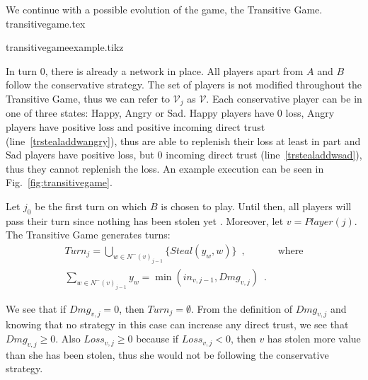   We continue with a possible evolution of the game, the Transitive Game.
  {transitivegame.tex}

  {transitivegameexample.tikz}

  \noindent In turn 0, there is already a network in place. All players apart from $A$ and $B$ follow the conservative
  strategy. The set of players is not modified throughout the Transitive Game, thus we can refer to $\mathcal{V}_j$ as
  $\mathcal{V}$. Each conservative player can be in one of three states: Happy, Angry or Sad. Happy players have 0 loss, Angry
  players have positive loss and positive incoming direct trust (line~\ref{trstealaddwangry}), thus are able to replenish
  their loss at least in part and Sad players have positive loss, but 0 incoming direct trust (line~\ref{trstealaddwsad}),
  thus they cannot replenish the loss. An example execution can be seen in Fig.~\ref{fig:transitivegame}.

  Let $j_0$ be the first turn on which $B$ is chosen to play. Until then, all players will pass their turn since nothing has
  been stolen yet \cite{trustisrisk}. Moreover, let $v = Player(j)$. The Transitive Game generates turns:
  \begin{align}
     Turn_j = \bigcup\limits_{w \in N^{-}\left(v\right)_{j-1}}\{Steal\left(y_w,w\right)\} \enspace, & \mbox{ where} \\
     \sum\limits_{w \in N^{-}\left(v\right)_{j-1}}y_w = \min\left(in_{v, j-1}, Dmg_{v, j}\right) \enspace. &
  \end{align}

  \noindent We see that if $Dmg_{v, j} = 0$, then $Turn_j = \emptyset$. From the definition of $Dmg_{v,j}$ and knowing that no
  strategy in this case can increase any direct trust, we see that $Dmg_{v,j} \geq 0$. Also $Loss_{v,j} \geq 0$ because
  if $Loss_{v,j} < 0$, then $v$ has stolen more value than she has been stolen, thus she would not be following the
  conservative strategy.
